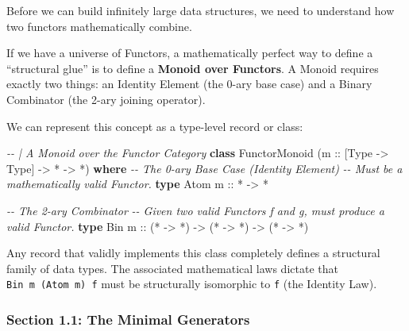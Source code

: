 \documentclass[
]{article}
\newenvironment{Shaded}{}{}
\newcommand{\CommentTok}[1]{\textcolor[rgb]{0.38,0.63,0.69}{\textit{#1}}}
\newcommand{\DataTypeTok}[1]{\textcolor[rgb]{0.56,0.13,0.00}{#1}}
\newcommand{\KeywordTok}[1]{\textcolor[rgb]{0.00,0.44,0.13}{\textbf{#1}}}
\newcommand{\NormalTok}[1]{#1}
\newcommand{\OperatorTok}[1]{\textcolor[rgb]{0.40,0.40,0.40}{#1}}
\newcommand{\OtherTok}[1]{\textcolor[rgb]{0.00,0.44,0.13}{#1}}
\begin{document}
Before we can build infinitely large data structures, we need to
understand how two functors mathematically combine.

If we have a universe of Functors, a mathematically perfect way to
define a ``structural glue'' is to define a \textbf{Monoid over
Functors}. A Monoid requires exactly two things: an Identity Element
(the 0-ary base case) and a Binary Combinator (the 2-ary joining
operator).

We can represent this concept as a type-level record or class:

\begin{Shaded}
\begin{Highlighting}[]
\CommentTok{{-}{-} | A Monoid over the Functor Category}
\KeywordTok{class} \DataTypeTok{FunctorMonoid}\NormalTok{ (}\OtherTok{m ::}\NormalTok{ [}\DataTypeTok{Type} \OtherTok{{-}\textgreater{}} \DataTypeTok{Type}\NormalTok{] }\OtherTok{{-}\textgreater{}} \OperatorTok{*} \OtherTok{{-}\textgreater{}} \OperatorTok{*}\NormalTok{) }\KeywordTok{where}
    \CommentTok{{-}{-} The 0{-}ary Base Case (Identity Element)}
    \CommentTok{{-}{-} Must be a mathematically valid Functor.}
    \KeywordTok{type} \DataTypeTok{Atom}\OtherTok{ m ::} \OperatorTok{*} \OtherTok{{-}\textgreater{}} \OperatorTok{*}
    
    \CommentTok{{-}{-} The 2{-}ary Combinator}
    \CommentTok{{-}{-} Given two valid Functors \textasciigrave{}f\textasciigrave{} and \textasciigrave{}g\textasciigrave{}, must produce a valid Functor.}
    \KeywordTok{type} \DataTypeTok{Bin}\OtherTok{ m ::}\NormalTok{ (}\OperatorTok{*} \OtherTok{{-}\textgreater{}} \OperatorTok{*}\NormalTok{) }\OtherTok{{-}\textgreater{}}\NormalTok{ (}\OperatorTok{*} \OtherTok{{-}\textgreater{}} \OperatorTok{*}\NormalTok{) }\OtherTok{{-}\textgreater{}}\NormalTok{ (}\OperatorTok{*} \OtherTok{{-}\textgreater{}} \OperatorTok{*}\NormalTok{)}
\end{Highlighting}
\end{Shaded}

Any record that validly implements this class completely defines a
structural family of data types. The associated mathematical laws
dictate that \texttt{Bin\ m\ (Atom\ m)\ f} must be structurally
isomorphic to \texttt{f} (the Identity Law).

\subsubsection{Section 1.1: The Minimal
Generators}\label{section-1.1-the-minimal-generators}
\end{document}
